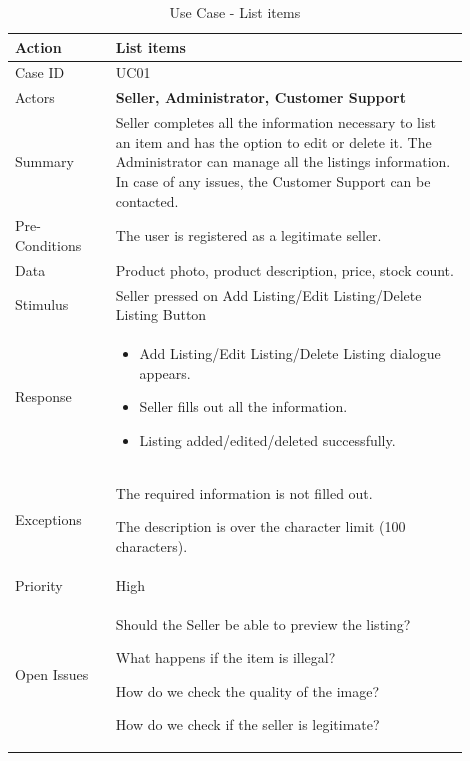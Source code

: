 \documentclass[11pt]{article}
\newcounter{use case ID}
\newcommand\tabularhead[1]{
    \begin{table}[ht]
        \addtocounter{use case ID}{1}
        \caption{Use Case \arabic{use case ID} - #1}
        \vspace{0.2cm}
        \begin{tabular}{|p{0.2\linewidth}|p{0.70\linewidth}|}
            \hline
            \textbf{Action} & \textbf{#1} \\
            \hline}
\newcommand\addrow[2]{#1 & #2\\ \hline}
\newcommand\addmulrow[2]{ \begin{minipage}[t][][t]{2.5cm}#1\end{minipage}
                &\begin{minipage}[t][][t]{11cm}
                    \begin{enumerate}[itemsep=-1ex] #2   \end{enumerate}
                \end{minipage}\vfill\\ \hline}
\newenvironment{usecase}{\tabularhead}
        {\hline\end{tabular}\end{table}}
\newcounter{req ID}
\begin{document}
\begin{usecase}{List items}
    \addrow{Case ID}{UC01}
    \addrow{Actors}{\textbf{Seller, Administrator, Customer Support}}
    \addrow{Summary}{Seller completes all the information necessary to list an item and has the option to edit or delete it. The Administrator can manage all the listings information. In case of any issues, the Customer Support can be contacted.}
    \addrow{Pre-Conditions}{The user is registered as a legitimate seller.}
    \addrow{Data}{Product photo, product description, price, stock count.}
    \addrow{Stimulus}{Seller pressed on Add Listing/Edit Listing/Delete Listing Button}
    \addmulrow{Response}{
        \begin{itemize}
            \item Add Listing/Edit Listing/Delete Listing dialogue appears.
            \item Seller fills out all the information.
            \item Listing added/edited/deleted successfully.
        \end {itemize}}
    \addmulrow{Exceptions}{
        \begin{enumerate}{
            \item The required information is not filled out.
            \item The description is over the character limit (100 characters). 
            } 
        \end{enumerate}}
    \addrow{Priority}{High}
    \addmulrow{Open Issues}{
        \begin{enumerate}{
            \item Should the Seller be able to preview the listing? 
            \item What happens if the item is illegal? 
            \item How do we check the quality of the image?
            \item How do we check if the seller is legitimate?
            } 
        \end{enumerate}}
\end{usecase}
\end{document}
